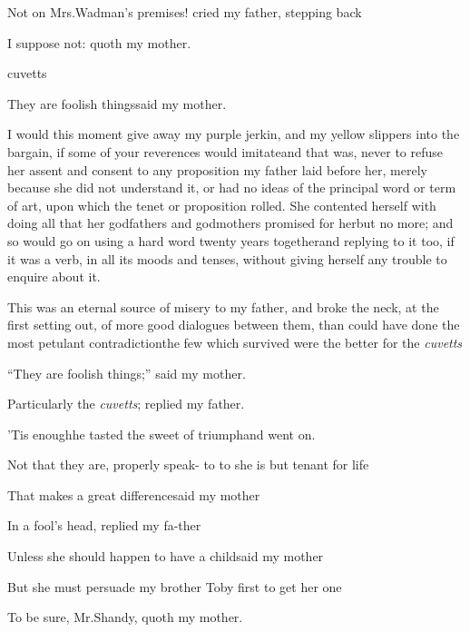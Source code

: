 \documentclass{article}
\begin{document}
\tsh Not on Mrs.\@ Wadman’s premises! cried
my father, stepping back\tsh

I suppose not: quoth my mother.

\noindent
{}
cuvetts\tsh

\tsh They are foolish things\tsh said my
mother.

\newpage
\noindent
{}
I would this moment give
away my purple jerkin, and my yellow slippers into the bargain, if
some of your reverences would imitate\tsk and that was, never to
refuse her assent and consent to any proposition my father laid
before her, merely because she did not understand it, or had no ideas of the principal word or term of art,
upon which the tenet or proposition rolled. She contented herself
with doing all that her godfathers and godmothers promised for
her\tsk but no more; and so would go on using a hard word twenty
years together\tsk and replying to it too, if it was a verb, in
all its moods and tenses, without giving herself any trouble to
enquire about it.

\newpage
This was an eternal source of misery to my father, and broke the
neck, at the first setting out, of more good dialogues between
them, than could have done the most petulant
contradiction\tsh the few which survived were the better
for the \textit{cuvetts}\tsh

\tsk “They are foolish things;” said my
mother.

\tsh Particularly the \textit{cuvetts}; replied my
father.

’Tis enough\tsk he tasted the sweet of triumph\tsk and
went on.

\tsk Not that they are, properly speak-\break
\hbox to 
\hbox to 
she is but tenant for life\tsh

\newpage
\tsh That makes a great difference\tsk\break said my
mother\tsh

\tsk In a fool’s head, replied my fa-\break ther\tsh

Unless she should happen to have a child\tsk said my
mother\tsh

\tsh But she must persuade my brother Toby first
to get her one\tsk

\tsh To be sure, Mr.\@ Shandy, quoth my mother.
\end{document}
